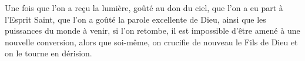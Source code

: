 Une fois que l’on a reçu la lumière, goûté au don du ciel,
	que l’on a eu part à l’Esprit Saint, que l’on a goûté la parole excellente de Dieu,
	ainsi que les puissances du monde à venir,
	si l’on retombe, il est impossible d’être amené à une nouvelle conversion,
	alors que soi-même, on crucifie de nouveau le Fils de Dieu
		et on le tourne en dérision.
